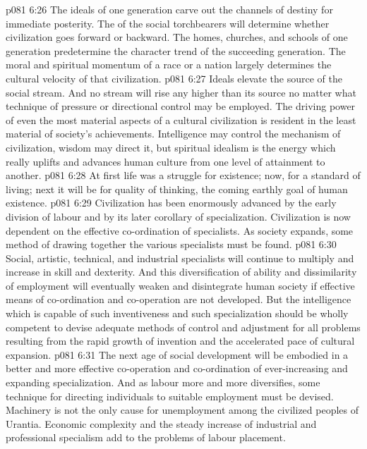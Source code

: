 \vs p081 6:26 \bibnobreakspace {} The ideals of one generation carve out the channels of destiny for immediate posterity. The  of the social torchbearers will determine whether civilization goes forward or backward. The homes, churches, and schools of one generation predetermine the character trend of the succeeding generation. The moral and spiritual momentum of a race or a nation largely determines the cultural velocity of that civilization.
\vs p081 6:27 Ideals elevate the source of the social stream. And no stream will rise any higher than its source no matter what technique of pressure or directional control may be employed. The driving power of even the most material aspects of a cultural civilization is resident in the least material of society’s achievements. Intelligence may control the mechanism of civilization, wisdom may direct it, but spiritual idealism is the energy which really uplifts and advances human culture from one level of attainment to another.
\vs p081 6:28 At first life was a struggle for existence; now, for a standard of living; next it will be for quality of thinking, the coming earthly goal of human existence.
\vs p081 6:29 \bibnobreakspace {} Civilization has been enormously advanced by the early division of labour and by its later corollary of specialization. Civilization is now dependent on the effective co\hyp{}ordination of specialists. As society expands, some method of drawing together the various specialists must be found.
\vs p081 6:30 Social, artistic, technical, and industrial specialists will continue to multiply and increase in skill and dexterity. And this diversification of ability and dissimilarity of employment will eventually weaken and disintegrate human society if effective means of co\hyp{}ordination and co\hyp{}operation are not developed. But the intelligence which is capable of such inventiveness and such specialization should be wholly competent to devise adequate methods of control and adjustment for all problems resulting from the rapid growth of invention and the accelerated pace of cultural expansion.
\vs p081 6:31 \bibnobreakspace {} The next age of social development will be embodied in a better and more effective co\hyp{}operation and co\hyp{}ordination of ever\hyp{}increasing and expanding specialization. And as labour more and more diversifies, some technique for directing individuals to suitable employment must be devised. Machinery is not the only cause for unemployment among the civilized peoples of Urantia. Economic complexity and the steady increase of industrial and professional specialism add to the problems of labour placement.
